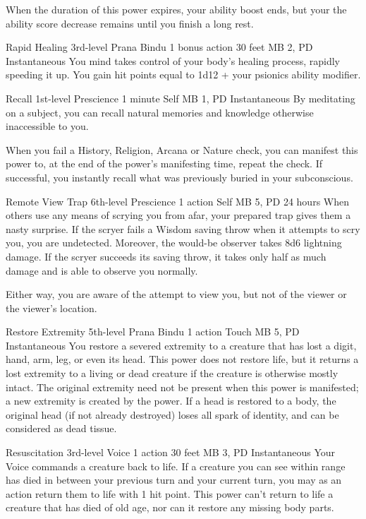   When the duration of this power expires,
  your ability boost ends,
  but your the ability score decrease
  remains until you finish a long rest.

\DndPowerHeader%
  {Rapid Healing}
  {3rd-level Prana Bindu}
  {1 bonus action}
  {30 feet}
  {MB 2, PD \lvlthree}
  {Instantaneous}
You mind takes control of your body's healing process,
rapidly speeding it up.
You gain hit points equal to 1d12 + your psionics ability modifier.

\DndPowerHeader%
  {Recall}
  {1st-level Prescience}
  {1 minute}
  {Self}
  {MB 1, PD \lvlone}
  {Instantaneous}
By meditating on a subject, you can recall
natural memories and knowledge otherwise inaccessible to you.

When you fail a History, Religion, Arcana or Nature check,
you can manifest this power to, at the end of the
power's manifesting time, repeat the check.
If successful, you instantly recall
what was previously buried in your subconscious.

\DndPowerHeader%
  {Remote View Trap}
  {6th-level Prescience}
  {1 action}
  {Self}
  {MB 5, PD \lvlsix}
  {24 hours}
  When others use any means of scrying you from afar,
  your prepared trap gives them a nasty surprise.
  If the scryer fails a Wisdom saving throw
  when it attempts to scry you,
  you are undetected.
  Moreover, the would-be observer takes 8d6 lightning damage.
  If the scryer succeeds its saving throw,
  it takes only half as much damage
  and is able to observe you normally.
  
  Either way, you are aware of the attempt to view you,
  but not of the viewer or the viewer's location.

\DndPowerHeader%
  {Restore Extremity}
  {5th-level Prana Bindu}
  {1 action}
  {Touch}
  {MB 5, PD \lvlfive}
  {Instantaneous}
  You restore a severed extremity to a creature that has
  lost a digit, hand, arm, leg,
  or even its head.
  This power does not restore life,
  but it returns a lost extremity to a living or dead creature
  if the creature is otherwise mostly intact.
  The original extremity need not be present
  when this power is manifested;
  a new extremity is created by the power.
  If a head is restored to a body,
  the original head (if not already destroyed)
  loses all spark of identity,
  and can be considered as dead tissue.

\DndPowerHeader%
  {Resuscitation}
  {3rd-level Voice}
  {1 action}
  {30 feet}
  {MB 3, PD \lvlthree}
  {Instantaneous}
Your Voice commands a creature back to life.
If a creature you can see within range
has died in between your previous turn
and your current turn,
you may as an action return them to life
with 1 hit point.
This power can't return to life a creature
that has died of old age,
nor can it restore any missing body parts.


